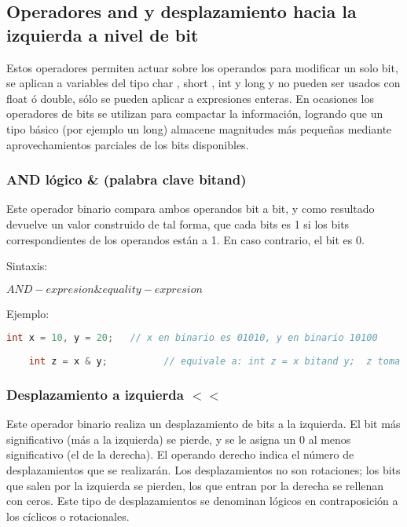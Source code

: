 \subsection{ Operadores and y desplazamiento hacia la izquierda a nivel de bit}
Estos operadores permiten actuar sobre los operandos para modificar un solo bit, se aplican a variables del tipo char , short , int y long y no pueden ser usados con float ó double, sólo se pueden aplicar a expresiones enteras. En ocasiones los operadores de bits se utilizan para compactar la información, logrando que un tipo básico (por ejemplo un long) almacene magnitudes más pequeñas mediante aprovechamientos parciales de los bits disponibles.

\subsubsection{AND lógico \& (palabra clave bitand)}

Este operador binario compara ambos operandos bit a bit, y como resultado devuelve un valor construido de tal forma, que cada bits es 1 si los bits correspondientes de los operandos están a 1. En caso contrario, el bit es 0.

Sintaxis:

$ AND-expresion \& equality-expresion $ 

Ejemplo:

\lstset{language=C++, breaklines=true, basicstyle=\footnotesize}
\begin{lstlisting}[language=C++]
	int x = 10, y = 20;   // x en binario es 01010, y en binario 10100
	
	int z = x & y;          // equivale a: int z = x bitand y;  z toma el valor 00000 es decir 0
\end{lstlisting}

\subsubsection{Desplazamiento a izquierda $ << $ }
Este operador binario realiza un desplazamiento de bits a la izquierda. El bit más significativo (más a la izquierda) se pierde, y se le asigna un 0 al menos significativo (el de la derecha). El operando derecho indica el número de desplazamientos que se realizarán. Los desplazamientos no son rotaciones; los bits que salen por la izquierda se pierden, los que entran por la derecha se rellenan con ceros. Este tipo de desplazamientos se denominan lógicos en contraposición a los cíclicos o rotacionales.

